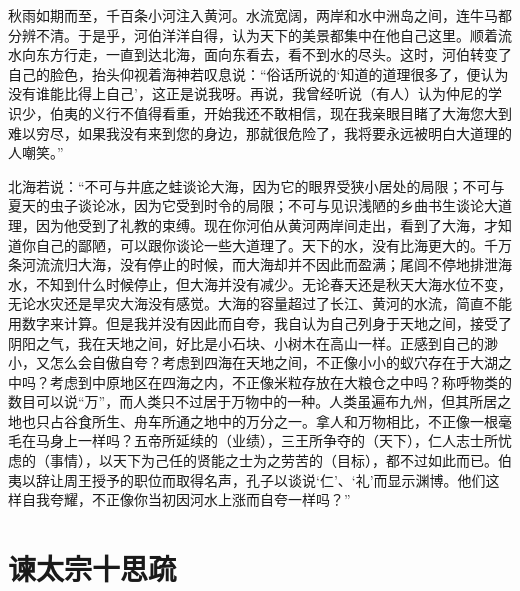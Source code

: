 \documentclass[12pt,UTF-8,openany,a4]{ctexbook}
\begin{document}
\begin{large}
    \yiwen 
    秋雨如期而至，千百条小河注入黄河。水流宽阔，两岸和水中洲岛之间，连牛马都分辨不清。于是乎，河伯洋洋自得，认为天下的美景都集中在他自己这里。顺着流水向东方行走，一直到达北海，面向东看去，看不到水的尽头。这时，河伯转变了自己的脸色，抬头仰视着海神若叹息说：“俗话所说的‘知道的道理很多了，便认为没有谁能比得上自己’，这正是说我呀。再说，我曾经听说（有人）认为仲尼的学识少，伯夷的义行不值得看重，开始我还不敢相信，现在我亲眼目睹了大海您大到难以穷尽，如果我没有来到您的身边，那就很危险了，我将要永远被明白大道理的人嘲笑。”
    
    北海若说：“不可与井底之蛙谈论大海，因为它的眼界受狭小居处的局限；不可与夏天的虫子谈论冰，因为它受到时令的局限；不可与见识浅陋的乡曲书生谈论大道理，因为他受到了礼教的束缚。现在你河伯从黄河两岸间走出，看到了大海，才知道你自己的鄙陋，可以跟你谈论一些大道理了。天下的水，没有比海更大的。千万条河流流归大海，没有停止的时候，而大海却并不因此而盈满；尾闾不停地排泄海水，不知到什么时候停止，但大海并没有减少。无论春天还是秋天大海水位不变，无论水灾还是旱灾大海没有感觉。大海的容量超过了长江、黄河的水流，简直不能用数字来计算。但是我并没有因此而自夸，我自认为自己列身于天地之间，接受了阴阳之气，我在天地之间，好比是小石块、小树木在高山一样。正感到自己的渺小，又怎么会自傲自夸？考虑到四海在天地之间，不正像小小的蚁穴存在于大湖之中吗？考虑到中原地区在四海之内，不正像米粒存放在大粮仓之中吗？称呼物类的数目可以说“万”，而人类只不过居于万物中的一种。人类虽遍布九州，但其所居之地也只占谷食所生、舟车所通之地中的万分之一。拿人和万物相比，不正像一根毫毛在马身上一样吗？五帝所延续的（业绩），三王所争夺的（天下），仁人志士所忧虑的（事情），以天下为己任的贤能之士为之劳苦的（目标），都不过如此而已。伯夷以辞让周王授予的职位而取得名声，孔子以谈说‘仁’、‘礼’而显示渊博。他们这样自我夸耀，不正像你当初因河水上涨而自夸一样吗？”
    
\end{large}



\chapter{谏太宗十思疏}
\end{document}
